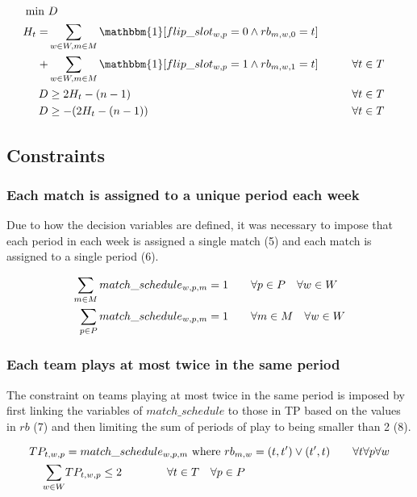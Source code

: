 \begin{align}
    \min \ &D \\
    H_t =& \sum_{w \in W, m \in M} \mathbbm{1}[flip\_slot_{w,p} = 0 \land rb_{m,w,0} = t] \notag \\
    +& \sum_{w \in W, m \in M} \mathbbm{1}[flip\_slot_{w,p} = 1 \land rb_{m, w,1} = t] \hspace{20px}  && \forall t \in T\\
    D &\geq 2H_t - (n-1) && \forall t \in T\\
    D & \geq -(2 H_t - (n-1)) && \forall t \in T
\end{align}

\subsection{Constraints}
\subsubsection{Each match is assigned to a unique period each week}
Due to how the decision variables are defined, it was necessary to impose that each period in each week is assigned a single match (5) and each match is assigned to a single period (6).

\begin{align}
    \sum_{m \in M} match\_schedule_{w,p,m} &= 1 \hspace{20px} \forall p \in P \hspace{10px} \forall w \in W\\
    \sum_{p \in P} match\_schedule_{w,p,m} &= 1 \hspace{20px} \forall m \in M \hspace{10px}\forall w \in W
\end{align}

\subsubsection{Each team plays at most twice in the same period}
The constraint on teams playing at most twice in the same period is imposed by first linking the variables of $match\_schedule$ to those in TP based on the values in $rb$ (7) and then limiting the sum of periods of play to being smaller than 2 (8). 

\begin{align}
    TP_{t,w,p} &= match\_schedule_{w,p,m} \ \text{where} \ rb_{m, w} =(t, t') \lor (t', t) \hspace{20px} \forall t \forall p  \forall w\\
    \sum_{w \in W} &TP_{t,w,p} \leq 2 \hspace{40px} \forall t \in T \hspace{10px} \forall p \in P
\end{align}

